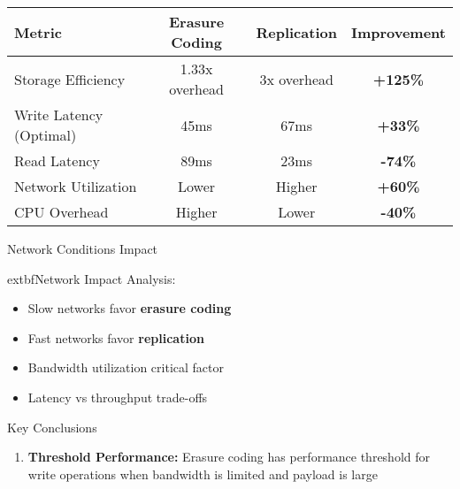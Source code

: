\documentclass[a2,portrait]{config/poster/a0poster}
\newcommand{\postersection}[1]{%
	\begin{tcolorbox}[
			colback=ITBblue,
			colframe=ITBblue,
			fonttitle=\bfseries,
			coltext=white,
			sharp corners,
			boxrule=0pt,
			top=0pt,
			bottom=0pt,
			halign=center
		]
		\normalsize #1
	\end{tcolorbox}%
}
\begin{document}
\begin{multicols}{2}
	\begin{center}
		\begin{tabular}{l c c c}
			\toprule
			\textbf{Metric} & \textbf{Erasure Coding} & \textbf{Replication} & \textbf{Improvement} \\
			\midrule
			Storage Efficiency & 1.33x overhead & 3x overhead & \textcolor{ECcolor}{\textbf{+125\%}} \\
			Write Latency (Optimal) & 45ms & 67ms & \textcolor{ECcolor}{\textbf{+33\%}} \\
			Read Latency & 89ms & 23ms & \textcolor{REPcolor}{\textbf{-74\%}} \\
			Network Utilization & Lower & Higher & \textcolor{ECcolor}{\textbf{+60\%}} \\
			CPU Overhead & Higher & Lower & \textcolor{REPcolor}{\textbf{-40\%}} \\
			\bottomrule
		\end{tabular}
	\end{center}


	\postersection{Network Conditions Impact}
	

			extbf{Network Impact Analysis:}
	\begin{itemize}
		\item Slow networks favor \textcolor{ECcolor}{\textbf{erasure coding}}
		\item Fast networks favor \textcolor{REPcolor}{\textbf{replication}}
		\item Bandwidth utilization critical factor
		\item Latency vs throughput trade-offs
	\end{itemize}


	\postersection{Key Conclusions}
	
	\begin{enumerate}
		\item \textbf{Threshold Performance:} Erasure coding has performance threshold for write operations when bandwidth is limited and payload is large
		

\end{enumerate}
\end{multicols}
\end{document}
